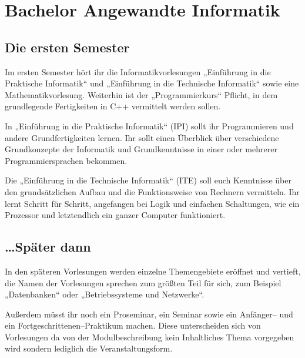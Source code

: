 \section{Bachelor Angewandte Informatik}

\subsection{Die ersten Semester}

Im ersten Semester hört ihr die Informatikvorlesungen „Einführung in die Praktische Informatik“ und „Einführung in die Technische Informatik“ sowie eine Mathematikvorlesung. Weiterhin ist der „Programmierkurs“ Pflicht, in dem grundlegende Fertigkeiten in C++ vermittelt werden sollen.

In „Einführung in die Praktische Informatik“ (IPI) sollt ihr Programmieren und andere Grundfertigkeiten lernen. Ihr sollt einen Überblick über verschiedene Grundkonzepte der Informatik und Grundkenntnisse in einer oder mehrerer Programmiersprachen bekommen.

Die „Einführung in die Technische Informatik“ (ITE) soll euch Kenntnisse über den grundsätzlichen Aufbau und die Funktionsweise von Rechnern vermitteln. Ihr lernt Schritt für Schritt, angefangen bei Logik und einfachen Schaltungen, wie ein Prozessor und letztendlich ein ganzer Computer funktioniert.


\subsection{\dots{}Später dann}

In den späteren Vorlesungen werden einzelne Themengebiete eröffnet und vertieft, die Namen der Vorlesungen sprechen zum größten Teil für sich, zum Beispiel „Datenbanken“ oder „Betriebssysteme und Netzwerke“.

Außerdem müsst ihr noch ein Proseminar, ein Seminar sowie ein Anfänger-- und ein Fortgeschrittenen--Praktikum machen. Diese unterscheiden sich von Vorlesungen da von der Modulbeschreibung kein Inhaltliches Thema vorgegeben wird sondern lediglich die Veranstaltungsform.

